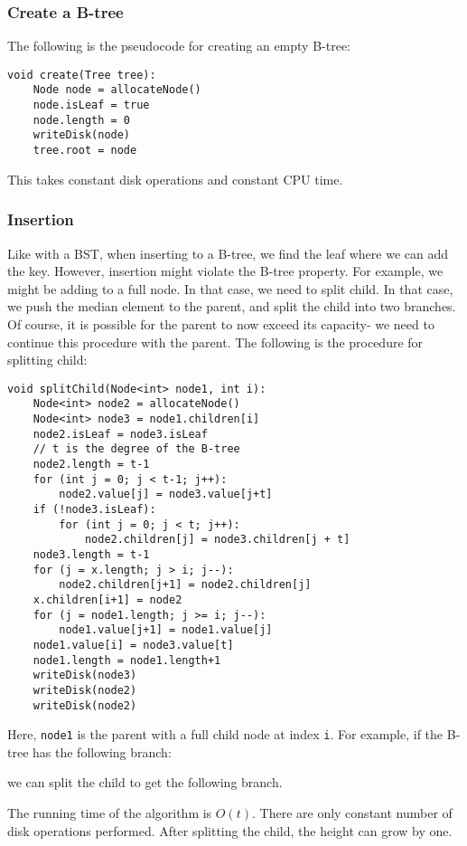 \documentclass[a4paper, openany]{memoir}
\begin{document}
\subsubsection{Create a B-tree}
The following is the pseudocode for creating an empty B-tree:
\begin{lstlisting}[language=pseudocode]
void create(Tree tree):
    Node node = allocateNode()
    node.isLeaf = true
    node.length = 0
    writeDisk(node)
    tree.root = node
\end{lstlisting}
This takes constant disk operations and constant CPU time.

\subsubsection{Insertion}
Like with a BST, when inserting to a B-tree, we find the leaf where we can add the key. However, insertion might violate the B-tree property. For example, we might be adding to a full node. In that case, we need to split child. In that case, we push the median element to the parent, and split the child into two branches. Of course, it is possible for the parent to now exceed its capacity- we need to continue this procedure with the parent. The following is the procedure for splitting child:
\begin{lstlisting}[language=pseudocode]
void splitChild(Node<int> node1, int i):
    Node<int> node2 = allocateNode()
    Node<int> node3 = node1.children[i]
    node2.isLeaf = node3.isLeaf
    // t is the degree of the B-tree
    node2.length = t-1
    for (int j = 0; j < t-1; j++):
        node2.value[j] = node3.value[j+t]
    if (!node3.isLeaf):
        for (int j = 0; j < t; j++):
            node2.children[j] = node3.children[j + t]
    node3.length = t-1
    for (j = x.length; j > i; j--):
        node2.children[j+1] = node2.children[j]
    x.children[i+1] = node2
    for (j = node1.length; j >= i; j--):
        node1.value[j+1] = node1.value[j]
    node1.value[i] = node3.value[t]
    node1.length = node1.length+1
    writeDisk(node3)
    writeDisk(node2)
    writeDisk(node2)
\end{lstlisting}
Here, \texttt{node1} is the parent with a full child node at index \texttt{i}. For example, if the B-tree has the following branch:
\begin{center}
\end{center}
we can split the child to get the following branch.
\begin{center}
\end{center}
The running time of the algorithm is $O(t)$. There are only constant number of disk operations performed. After splitting the child, the height can grow by one.
\end{document}
